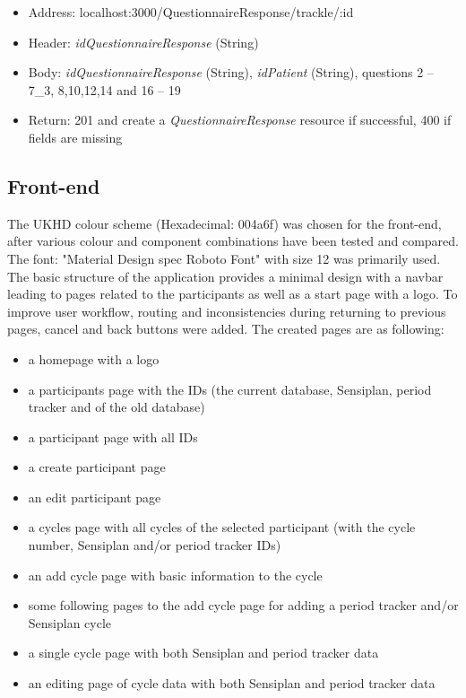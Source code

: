 \documentclass[
a4paper,
11pt
]{article}
\begin{document}
\begin{itemize}
\begin{itemize}
\begin{itemize}
				\item Address: localhost:3000/QuestionnaireResponse/trackle/:id
				\item Header: \textit{idQuestionnaireResponse} (String)
				\item Body: \textit{idQuestionnaireResponse} (String), \textit{idPatient} (String),  questions 2 – 7\_3, 8,10,12,14 and 16 – 19
				\item Return: 201 and create a \textit{QuestionnaireResponse} resource if successful, 400 if fields are missing
			\end{itemize}
		\end{itemize}
	\end{itemize}
	\newpage
	\subsection{Front-end}
	The \ac{UKHD} colour scheme \textcolor{UKHD}{(Hexadecimal: 004a6f)} was chosen for the front-end, after various colour and component combinations have been tested and compared. The font: "Material Design spec Roboto Font" with size 12 was primarily used. The basic structure of the application provides a minimal design with a navbar leading to pages related to the participants as well as a start page with a logo. To improve user workflow, routing and inconsistencies during returning to previous pages, cancel and back buttons were added. The created pages are as following:
	\begin{itemize}
		\item a homepage with a logo
		\item a participants page with the IDs (the current database, Sensiplan\textsuperscript{\textcopyright}, period tracker and of the old database)
		\item a participant page with all IDs
		\item a create participant page
		\item an edit participant page
		\item a cycles page with all cycles of the selected participant (with the cycle number, Sensiplan\textsuperscript{\textcopyright} and/or period tracker IDs)
		\item an add cycle page with basic information to the cycle
		\item some following pages to the add cycle page for adding a period tracker and/or Sensiplan\textsuperscript{\textcopyright} cycle
		\item a single cycle page with both Sensiplan\textsuperscript{\textcopyright} and period tracker data
		\item an editing page of cycle data with both Sensiplan\textsuperscript{\textcopyright} and period tracker data
	\end{itemize}
	\newpage
	
\end{document}
